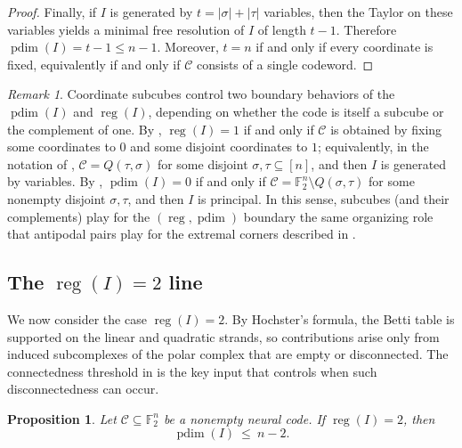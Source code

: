\documentclass[12pt]{amsart}
\newtheorem{proposition}[theorem]{Proposition}
\theoremstyle{remark}
\newtheorem{remark}[theorem]{Remark}
\theoremstyle{definition}
\DeclareMathOperator{\reg}{reg}
\DeclareMathOperator{\pd}{pdim}
\newcommand{\F}{\mathbb{F}}
\newcommand{\C}{\mathcal{C}}
\begin{document}
\begin{proof}
Finally, if $I$ is generated by $t=|\sigma|+|\tau|$ variables, then the Taylor on these variables
yields a  minimal free resolution of $I$ of
length $t-1$. Therefore $\pd(I)=t-1\le n-1$. Moreover, $t=n$ if and only if every coordinate is fixed,
equivalently if and only if $\C$ consists of a single codeword.
\end{proof}



\begin{remark}\label{rem:subcube-vs-cosubcube}
Coordinate subcubes control two boundary behaviors of the $\pd(I) $ and $\reg(I)$, depending on
whether the code is itself a subcube or the complement of one.  By ,
$\reg(I)=1$ if and only if $\C$ is obtained by fixing some coordinates to $0$ and some disjoint
coordinates to $1$; equivalently, in the notation of ,
$\C=Q(\tau,\sigma)$ for some disjoint $\sigma,\tau\subseteq[n]$, and then $I$ is generated by variables.
By , $\pd(I)=0$ if and only if $\C=\F_2^n\setminus Q(\sigma,\tau)$ for
some nonempty disjoint $\sigma,\tau$, and then $I$ is principal.
In this sense, subcubes (and their complements) play for the $(\reg,\pd)$ boundary the same organizing role
that antipodal pairs play for the extremal corners described in
.

\end{remark}





\subsection{The $\reg  (I)=2$ line}\label{sec:reg2-line}

We now consider the case $\reg(I)=2$.  By Hochster’s formula, the Betti table is supported on the linear
and quadratic strands, so contributions arise only from induced subcomplexes of the polar complex that
are empty or disconnected.  The connectedness threshold in  is the key input
that controls when such disconnectedness can occur.




\begin{proposition}\label{prop:reg2-pd-bound}
Let $\C\subseteq\F_2^n$ be a nonempty neural code. If $\reg(I)=2$, then
\[
\pd(I)\ \le\ n-2.
\]
\end{proposition}
\end{document}
